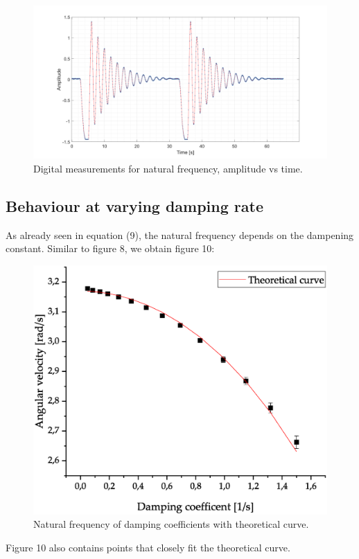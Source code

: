 \documentclass{article}
\begin{document}
\begin{figure}[H]
\centering
\includegraphics[width=400pt]{eigen.png}
\caption{Digital measurements for natural frequency, amplitude vs time.}
\label{fig:length_eight_mouse}
\end{figure}
\subsection{Behaviour at varying damping rate}
As already seen in equation (9), the natural frequency depends on the dampening constant.	Similar to figure 8, we obtain figure 10:
\begin{figure}[H]
\centering
\includegraphics[width=350pt]{DampeningVsFrq.eps}
\caption{Natural frequency of damping coefficients with theoretical curve.}
\label{fig:length_eight_mouse}
\end{figure}
\noindent
Figure 10 also contains points that closely fit the theoretical curve.
\end{document}
